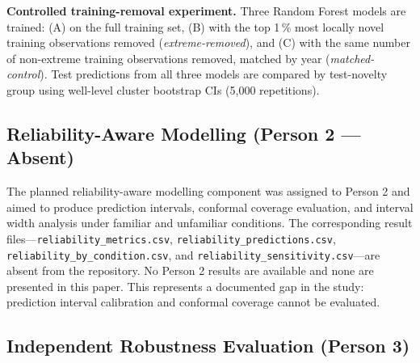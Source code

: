 \documentclass[conference]{IEEEtran}
\begin{document}
\textbf{Controlled training-removal experiment.}
Three Random Forest models are trained:
(A) on the full training set,
(B) with the top 1\,\% most locally novel training observations removed
(\emph{extreme-removed}), and
(C) with the same number of non-extreme training observations removed,
matched by year (\emph{matched-control}).
Test predictions from all three models are compared by test-novelty group
using well-level cluster bootstrap CIs (5{,}000 repetitions).

\subsection{Reliability-Aware Modelling (Person 2 — Absent)}
\label{sec:method:p2}

The planned reliability-aware modelling component was assigned to
Person 2 and aimed to produce prediction intervals, conformal coverage
evaluation, and interval width analysis under familiar and unfamiliar
conditions.
The corresponding result files---\texttt{reliability\_metrics.csv},
\texttt{reliability\_predictions.csv},
\texttt{reliability\_by\_condition.csv}, and
\texttt{reliability\_sensitivity.csv}---are absent from the repository.
No Person 2 results are available and none are presented in this paper.
This represents a documented gap in the study: prediction interval
calibration and conformal coverage cannot be evaluated.

\subsection{Independent Robustness Evaluation (Person 3)}
\label{sec:method:p3}
\end{document}
